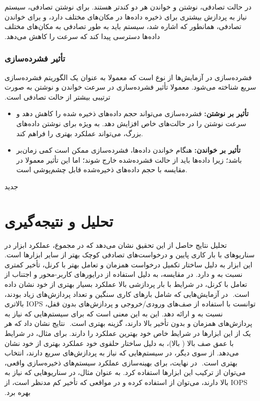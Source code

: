 ‫در حالت تصادفی، نوشتن و خواندن هر دو کندتر هستند. برای نوشتن تصادفی، سیستم نیاز به پردازش بیشتری برای ذخیره داده‌ها در مکان‌های مختلف دارد، و برای خواندن تصادفی، همانطور که اشاره شد، سیستم باید به طور تصادفی به مکان‌های مختلف داده‌ها دسترسی پیدا کند که سرعت را کاهش می‌دهد.
‫
‫\subsubsection*{تأثیر فشرده‌سازی}
‫فشرده‌سازی در آزمایش‌ها از نوع  است که معمولا به عنوان یک الگوریتم فشرده‌سازی سریع شناخته می‌شود. معمولا تأثیر فشرده‌سازی در سرعت خواندن و نوشتن به صورت ترتیبی بیشتر از حالت تصادفی است.
‫\begin{itemize}
‫    \item \textbf{تأثیر بر نوشتن:} فشرده‌سازی می‌تواند حجم داده‌های ذخیره شده را کاهش دهد و سرعت نوشتن را در حالت‌های خاص افزایش دهد. به ویژه برای نوشتن داده‌های بزرگ، می‌تواند عملکرد بهتری را فراهم کند.
‫    \item \textbf{تأثیر بر خواندن:} هنگام خواندن داده‌ها، فشرده‌سازی ممکن است کمی زمان‌بر باشد؛ زیرا داده‌ها باید از حالت فشرده‌شده خارج شوند؛ اما این تأثیر معمولا در مقایسه با حجم داده‌های ذخیره‌شده قابل چشم‌پوشی است.
‫\end{itemize}
‫
‫‌جدید
‫
‫\section{تحلیل و نتیجه‌گیری}
‫تحلیل نتایج حاصل از این تحقیق نشان می‌دهد که در مجموع، عملکرد ابزار  در سناریوهای با بار کاری پایین و درخواست‌های تصادفی کوچک بهتر از سایر ابزارها است. این ابزار به دلیل ساختار تکمیل درخواست همزمان و تعامل بهتر با کرنل، تأخیر کمتری نسبت به  و  دارد. در مقایسه،  به دلیل استفاده از درایورهای کاربر-محور و اجتناب از تعامل با کرنل، در شرایط با بار پردازشی بالا عملکرد بسیار بهتری از خود نشان داده است.
‫
‫در آزمایش‌هایی که شامل بارهای کاری سنگین و تعداد پردازش‌های زیاد بودند،  توانست با استفاده از صف‌های ورودی/خروجی و پردازش‌های بدون قفل، IOPS بالاتری نسبت به  و  ارائه دهد. این به این معنی است که برای سیستم‌هایی که نیاز به پردازش‌های همزمان و بدون تأخیر بالا دارند،  گزینه بهتری است.
‫
‫نتایج نشان داد که هر یک از این ابزارها در شرایط خاص خود بهترین عملکرد را دارند. برای مثال، در شرایط با عمق صف بالا ( بالا)،  به دلیل ساختار حلقوی خود عملکرد بهتری از خود نشان می‌دهد. از سوی دیگر، در سیستم‌هایی که نیاز به پردازش‌های سریع دارند،  انتخاب بهتری است.
‫
‫در نهایت، برای بهینه‌سازی عملکرد سیستم‌های ذخیره‌سازی واقعی، می‌توان از ترکیب این ابزارها استفاده کرد. به عنوان مثال، در سناریوهایی که نیاز به IOPS بالا دارند، می‌توان از  استفاده کرده و در مواقعی که تأخیر کم مدنظر است، از  بهره برد.
